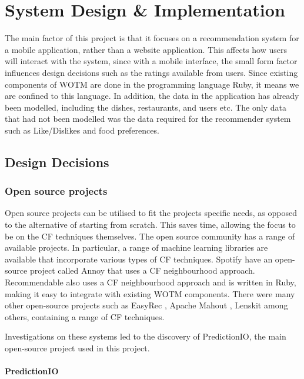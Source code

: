 \chapter{System Design \& Implementation}\label{C:work_done}

The main factor of this project is that it focuses on a recommendation system for a mobile application, rather than a website application. This affects how users will interact with the system, since with a mobile interface, the small form factor influences design decisions such as the ratings available from users. Since existing components of WOTM are done in the programming language Ruby, it means we are confined to this language. In addition, the data in the application has already been modelled, including the dishes, restaurants, and users etc. The only data that had not been modelled was the data required for the recommender system such as Like/Dislikes and food preferences.   

\section{Design Decisions}

\subsection{Open source projects}

Open source projects can be utilised to fit the projects specific needs, as opposed to the alternative of starting from scratch. This saves time, allowing the focus to be on the CF techniques themselves. The open source community has a range of available projects. In particular, a range of machine learning libraries are available that incorporate various types of CF techniques. Spotify \cite{annoy} have an open-source project called Annoy \cite{annoy} that uses a CF neighbourhood approach. Recommendable \cite{recommendable} also uses a CF neighbourhood approach and is written in Ruby, making it easy to integrate with existing WOTM components. There were many other open-source projects such as EasyRec \cite{easyrec}, Apache Mahout \cite{mahoutaction}, Lenskit \cite{lenskit} among others, containing a range of CF techniques. 

Investigations on these systems led to the discovery of PredictionIO, the main open-source project used in this project.

\subsubsection{PredictionIO}

